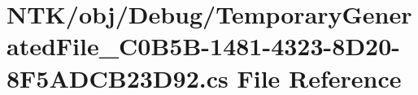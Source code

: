 \hypertarget{_temporary_generated_file__036_c0_b5_b-1481-4323-8_d20-8_f5_a_d_c_b23_d92_8cs}{}\section{N\+T\+K/obj/\+Debug/\+Temporary\+Generated\+File\+\_\+C0\+B5\+B-\/1481-\/4323-\/8\+D20-\/8\+F5\+A\+D\+C\+B23\+D92.cs File Reference}
\label{_temporary_generated_file__036_c0_b5_b-1481-4323-8_d20-8_f5_a_d_c_b23_d92_8cs}

